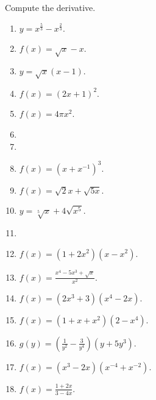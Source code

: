 Compute the derivative.
\begin{multicols}{2}
\begin{enumerate}[ref={\fcProblemRef}]
\item $\displaystyle y=x^{\frac53}-x^{\frac23}$.

\item $\displaystyle f(x)=\sqrt{x}-x$.

\item $\displaystyle y=\sqrt{x}(x-1)$.

\item $\displaystyle f(x)=(2x+1)^2$.

\item $\displaystyle f(x)=4\pi x^2$.

\item 
\item 
\item $\displaystyle f(x)=\left(x+x^{-1}\right)^3$.

\item $\displaystyle f(x)=\sqrt 2 x +\sqrt{5x}$.

\item $\displaystyle y=\sqrt[5]x+4\sqrt{x^5}$.
\item  

\item $\displaystyle f(x)=(1+2x^2)(x-x^2)$.

\item $\displaystyle f(x)=\frac{x^4-5x^3+ \sqrt{x}}{x^2}$.

\item $\displaystyle f(x)=(2x^3+3)(x^4-2x)$.

\item $\displaystyle f(x)=(1+x+x^2)(2-x^4)$.

\item $\displaystyle g(y)= \left(\frac{1}{y^2}- \frac{3}{y^4} \right)(y+5y^3)$.

\item $\displaystyle f(x)=(x^3-2x)(x^{-4}+x^{-2})$.

\item $\displaystyle f(x)=\frac{1+2x}{3-4x}$.

\end{enumerate}
\end{multicols}